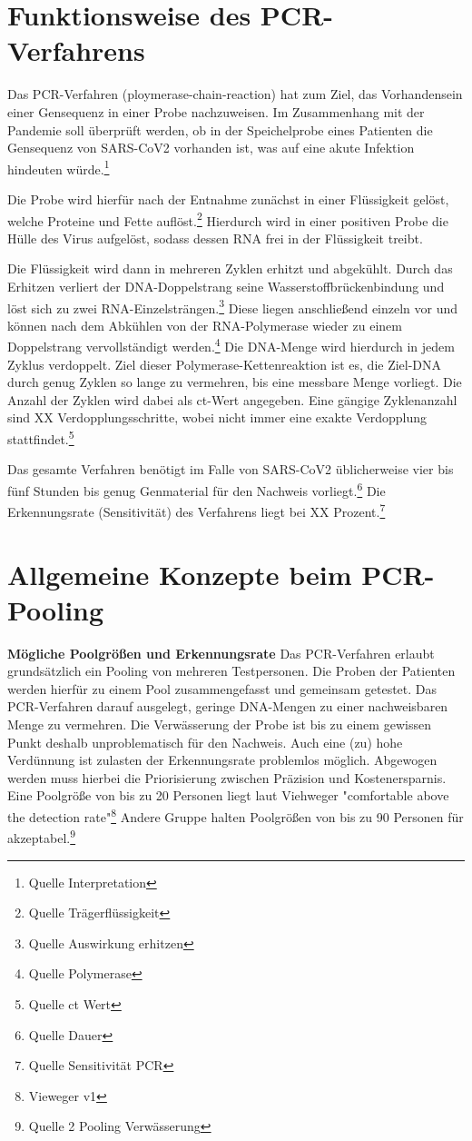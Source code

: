 \cleardoublepage

\section{Funktionsweise des PCR-Verfahrens}
Das PCR-Verfahren (ploymerase-chain-reaction) hat zum Ziel, das Vorhandensein einer Gensequenz in einer Probe nachzuweisen.
Im Zusammenhang mit der Pandemie soll überprüft werden, ob in der Speichelprobe eines Patienten die Gensequenz von SARS-CoV2 vorhanden ist, was auf eine akute Infektion hindeuten würde.\footnote{Quelle Interpretation}

Die Probe wird hierfür nach der Entnahme zunächst in einer Flüssigkeit gelöst, welche Proteine und Fette auflöst.\footnote{Quelle Trägerflüssigkeit}
Hierdurch wird in einer positiven Probe die Hülle des Virus aufgelöst, sodass dessen RNA frei in der Flüssigkeit treibt.

Die Flüssigkeit wird dann in mehreren Zyklen erhitzt und abgekühlt.
Durch das Erhitzen verliert der DNA-Doppelstrang seine Wasserstoffbrückenbindung und löst sich zu zwei RNA-Einzelsträngen.\footnote{Quelle Auswirkung erhitzen}
Diese liegen anschließend einzeln vor und können nach dem Abkühlen von der RNA-Polymerase wieder zu einem Doppelstrang vervollständigt werden.\footnote{Quelle Polymerase}
Die DNA-Menge wird hierdurch in jedem Zyklus verdoppelt.
Ziel dieser Polymerase-Kettenreaktion ist es, die Ziel-DNA durch genug Zyklen so lange zu vermehren, bis eine messbare Menge vorliegt.
Die Anzahl der Zyklen wird dabei als ct-Wert angegeben.
Eine gängige Zyklenanzahl sind XX Verdopplungsschritte, wobei nicht immer eine exakte Verdopplung stattfindet.\footnote{Quelle ct Wert}

Das gesamte Verfahren benötigt im Falle von SARS-CoV2 üblicherweise vier bis fünf Stunden bis genug Genmaterial für den Nachweis vorliegt.\footnote{Quelle Dauer}
Die Erkennungsrate (Sensitivität) des Verfahrens liegt bei XX Prozent.\footnote{Quelle Sensitivität PCR}

\cleardoublepage

\section{Allgemeine Konzepte beim PCR-Pooling}
\textbf{Mögliche Poolgrößen und Erkennungsrate}\newline
Das PCR-Verfahren erlaubt grundsätzlich ein Pooling von mehreren Testpersonen.
Die Proben der Patienten werden hierfür zu einem Pool zusammengefasst und gemeinsam getestet.
Das PCR-Verfahren darauf ausgelegt, geringe DNA-Mengen zu einer nachweisbaren Menge zu vermehren.
Die Verwässerung der Probe ist bis zu einem gewissen Punkt deshalb unproblematisch für den Nachweis.
Auch eine (zu) hohe Verdünnung ist zulasten der Erkennungsrate problemlos möglich.
Abgewogen werden muss hierbei die Priorisierung zwischen Präzision und Kostenersparnis.
Eine Poolgröße von bis zu 20 Personen liegt laut Viehweger "comfortable above the detection rate"\footnote{Vieweger v1}
Andere Gruppe halten Poolgrößen von bis zu 90 Personen für akzeptabel.\footnote{Quelle 2 Pooling Verwässerung}


